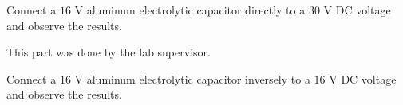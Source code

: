 \documentclass[11pt]{article}
\begin{document}
\begin{question}
\begin{subquestion}{Connect a $16$ V aluminum electrolytic capacitor directly to a $30$ V DC voltage and observe the results.}
{            This part was done by the lab supervisor.

        }
    \end{subquestion}

    \begin{subquestion}{Connect a $16$ V aluminum electrolytic capacitor inversely to a $16$ V DC voltage and observe the results.}
    \end{subquestion}

\end{question}

\end{document}
